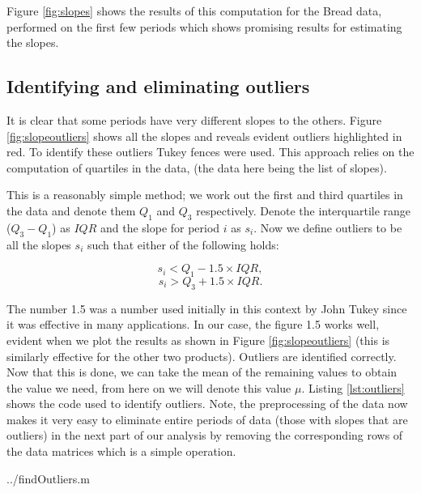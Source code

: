 Figure \ref{fig:slopes} shows the results of this computation for the Bread data, performed on the first few periods which shows promising results for estimating the slopes. 



\subsection{Identifying and eliminating outliers}

It is clear that some periods have very different slopes to the others. Figure \ref{fig:slopeoutliers} shows all the slopes and reveals evident outliers highlighted in red. To identify these outliers Tukey fences \cite{tukey} were used. This approach relies on the computation of quartiles in the data, (the data here being the list of slopes).

This is a reasonably simple method; we work out the first and third quartiles in the data and denote them $Q_1$ and $Q_3$ respectively. Denote the interquartile range ($Q_3 - Q_1$)  as $IQR$ and the slope for period $i$ as $s_i$. Now we define outliers to be all the slopes $s_i$ such that either of the following holds:

$$
s_i < Q_1 - 1.5 \times IQR,
$$
$$
s_i > Q_3 + 1.5 \times IQR .
$$

The number 1.5 was a number used initially in this context by John Tukey \cite{tukey} since it was effective in many applications. In our case, the figure 1.5 works well, evident when we plot the results as shown in Figure \ref{fig:slopeoutliers} (this is similarly effective for the other two products). Outliers are identified correctly. Now that this is done, we can take the mean of the remaining values to obtain the value we need, from here on we will denote this value $\mu$. Listing \ref{lst:outliers} shows the code used to identify outliers. Note, the preprocessing of the data now makes it very easy to eliminate entire periods of data (those with slopes that are outliers) in the next part of our analysis by removing the corresponding rows of the data matrices which is a simple operation.

 {../findOutliers.m}

